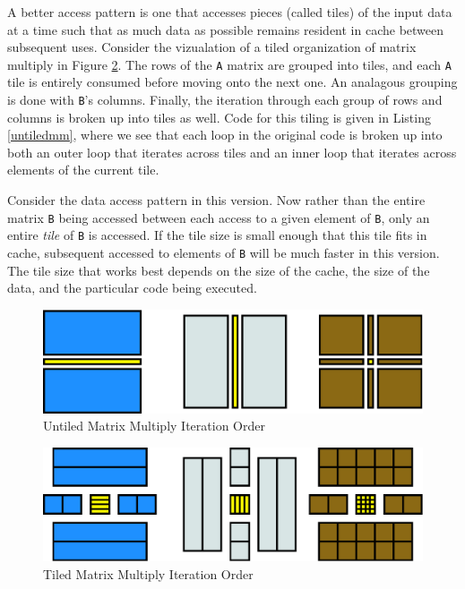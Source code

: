\documentclass[preprint,9pt]{sigplanconf}
\begin{document}
A better access pattern is one that accesses pieces (called tiles) of the input data at a time such that as much data as possible remains resident in cache between subsequent uses.  Consider the vizualation of a tiled organization of matrix multiply in Figure \ref{tiled_diagram}.  The rows of the \lstinline{A} matrix are grouped into tiles, and each \lstinline{A} tile is entirely consumed before moving onto the next one.  An analagous grouping is done with \lstinline{B}'s columns.  Finally, the iteration through each group of rows and columns is broken up into tiles as well.  Code for this tiling is given in Listing \ref{untiledmm}, where we see that each loop in the original code is broken up into both an outer loop that iterates across tiles and an inner loop that iterates across elements of the current tile.

Consider the data access pattern in this version.  Now rather than the entire matrix \lstinline{B} being accessed between each access to a given element of \lstinline{B}, only an entire \emph{tile} of \lstinline{B} is accessed.  If the tile size is small enough that this tile fits in cache, subsequent accessed to elements of \lstinline{B} will be much faster in this version.  The tile size that works best depends on the size of the cache, the size of the data, and the particular code being executed.

\begin{figure}
\centering
\includegraphics[scale=0.4]{UntiledMMIterationSpace.pdf}
\caption{Untiled Matrix Multiply Iteration Order}
\label{untiled_diagram}
\end{figure}

\begin{figure}
\centering
\includegraphics[scale=0.4]{TiledMMIterationSpace.pdf}
\caption{Tiled Matrix Multiply Iteration Order}
\label{tiled_diagram}
\end{figure}
\end{document}

